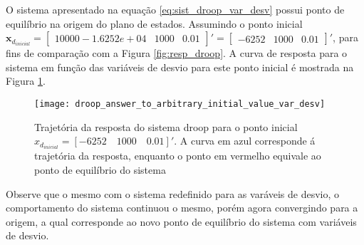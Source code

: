 O sistema apresentado na equação \ref{eq:sist_droop_var_desv} possui ponto de equilíbrio na origem do plano de estados. Assumindo o ponto inicial $\textbf{x}_{d_{inicial}} = \begin{bmatrix}10000 - 1.6252e+04&1000&0.01\end{bmatrix}' = \begin{bmatrix}-6252&1000&0.01\end{bmatrix}'$, para fins de comparação com a Figura \ref{fig:resp_droop}. A curva de resposta para o sistema em função das variáveis de desvio para este ponto inicial é mostrada na Figura \ref{fig:resp_droop_var_desvio}.

\begin{figure}[htbp]
	\centering
	\texttt{[image: droop\_answer\_to\_arbitrary\_initial\_value\_var\_desv]}
	\caption{Trajetória da resposta do sistema droop para o ponto inicial $x_{d_{inicial}} = [-6252\quad1000\quad0.01]'$. A curva em azul corresponde á trajetória da resposta, enquanto o ponto em vermelho equivale ao ponto de equilíbrio do sistema}
	 \label{fig:resp_droop_var_desvio}
\end{figure}

Observe que o mesmo com o sistema redefinido para as varáveis de desvio, o comportamento do sistema continuou o mesmo, porém agora convergindo para a origem, a qual corresponde ao novo ponto de equilíbrio do sistema com variáveis de desvio.

